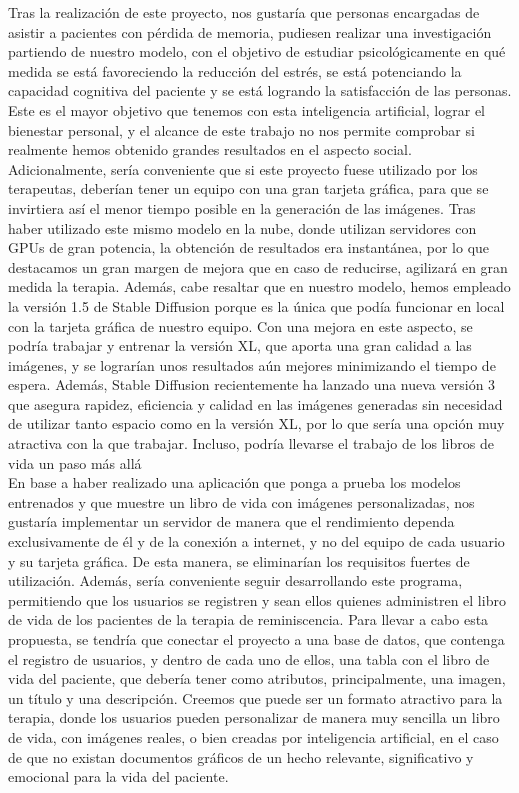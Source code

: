 Tras la realización de este proyecto, nos gustaría que personas encargadas de asistir a pacientes con pérdida de memoria, pudiesen realizar una investigación partiendo de nuestro modelo, con el objetivo de estudiar psicológicamente en qué medida se está favoreciendo la reducción del estrés, se está potenciando la capacidad cognitiva del paciente y se está logrando la satisfacción de las personas. Este es el mayor objetivo que tenemos con esta inteligencia artificial, lograr el bienestar personal, y el alcance de este trabajo no nos permite comprobar si realmente hemos obtenido grandes resultados en el aspecto social.\\

Adicionalmente, sería conveniente que si este proyecto fuese utilizado por los terapeutas, deberían tener un equipo con una gran tarjeta gráfica, para que se invirtiera así el menor tiempo posible en la generación de las imágenes. Tras haber utilizado este mismo modelo en la nube, donde utilizan servidores con GPUs de gran potencia, la obtención de resultados era instantánea, por lo que destacamos un gran margen de mejora que en caso de reducirse, agilizará en gran medida la terapia. Además, cabe resaltar que en nuestro modelo, hemos empleado la versión 1.5 de Stable Diffusion porque es la única que podía funcionar en local con la tarjeta gráfica de nuestro equipo. Con una mejora en este aspecto, se podría trabajar y entrenar la versión XL, que aporta una gran calidad a las imágenes, y se lograrían unos resultados aún mejores minimizando el tiempo de espera.  Además, Stable Diffusion recientemente ha lanzado una nueva versión 3 que asegura rapidez, eficiencia y calidad en las imágenes generadas sin necesidad de utilizar tanto espacio como en la versión XL, por lo que sería una opción muy atractiva con la que trabajar. Incluso, podría llevarse el trabajo de los libros de vida un paso más allá  \\

En base a haber realizado una aplicación que ponga a prueba los modelos entrenados y que muestre un libro de vida con imágenes personalizadas, nos gustaría implementar un servidor de manera que el rendimiento dependa exclusivamente de él y de la conexión a internet, y no del equipo de cada usuario y su tarjeta gráfica. De esta manera, se eliminarían los requisitos fuertes de utilización. Además, sería conveniente seguir desarrollando este programa, permitiendo que los usuarios se registren y sean ellos quienes administren el libro de vida de los pacientes de la terapia de reminiscencia. Para llevar a cabo esta propuesta, se tendría que conectar el proyecto a una base de datos, que contenga el registro de usuarios, y dentro de cada uno de ellos, una tabla con el libro de vida del paciente, que debería tener como atributos, principalmente, una imagen, un título y una descripción. Creemos que puede ser un formato atractivo para la terapia, donde los usuarios pueden personalizar de manera muy sencilla un libro de vida, con imágenes reales, o bien creadas por inteligencia artificial, en el caso de que no existan documentos gráficos de un hecho relevante, significativo y emocional para la vida del paciente.


